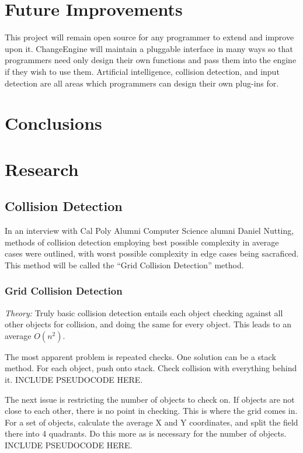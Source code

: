 \documentclass[12pt]{article}
\begin{document}
  \section{Future Improvements}
    This project will remain open source for any programmer to extend and improve upon it. ChangeEngine will maintain a pluggable interface in many ways so that programmers need only design their own functions and pass them into the engine if they wish to use them. Artificial intelligence, collision detection, and input detection are all areas which programmers can design their own plug-ins for.

  \section{Conclusions}

  \newpage

  \appendix
  \section{Research}

  \subsection{Collision Detection}
    In an interview with Cal Poly Alumni Computer Science alumni Daniel Nutting, methods of collision detection employing best possible complexity in average cases were outlined, with worst possible complexity in edge cases being sacraficed. This method will be called the ``Grid Collision Detection'' method.

    \subsubsection{Grid Collision Detection}
      \emph{Theory: } Truly basic collision detection entails each object checking against all other objects for collision, and doing the same for every object. This leads to an average $O(n^2)$.

      The most apparent problem is repeated checks. One solution can be a stack method. For each object, push onto stack. Check collision with everything behind it. INCLUDE PSEUDOCODE HERE.

      The next issue is restricting the number of objects to check on. If objects are not close to each other, there is no point in checking. This is where the grid comes in. For a set of objects, calculate the average X and Y coordinates, and split the field there into 4 quadrants. Do this more as is necessary for the number of objects. INCLUDE PSEUDOCODE HERE.
\end{document}
